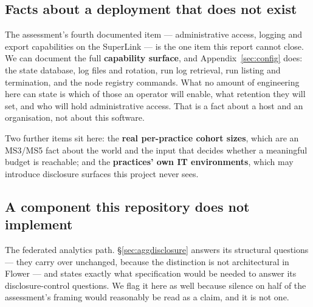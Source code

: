 \subsection{Facts about a deployment that does not exist}

The assessment's fourth documented item --- administrative access, logging and export capabilities
on the SuperLink --- is the one item this report cannot close. We can document the full
\textbf{capability surface}, and Appendix~\ref{sec:config} does: the state database, log files and
rotation, run log retrieval, run listing and termination, and the node registry commands. What no
amount of engineering here can state is which of those an operator will enable, what retention they
will set, and who will hold administrative access. That is a fact about a host and an organisation,
not about this software.

Two further items sit here: the \textbf{real per-practice cohort sizes}, which are an MS3/MS5 fact
about the world and the input that decides whether a meaningful budget is reachable; and the
\textbf{practices' own IT environments}, which may introduce disclosure surfaces this project never
sees.

\subsection{A component this repository does not implement}

The federated analytics path. \S\ref{sec:aggdisclosure} answers its structural questions --- they
carry over unchanged, because the distinction is not architectural in Flower --- and states exactly
what specification would be needed to answer its disclosure-control questions. We flag it here as
well because silence on half of the assessment's framing would reasonably be read as a claim, and it
is not one.
